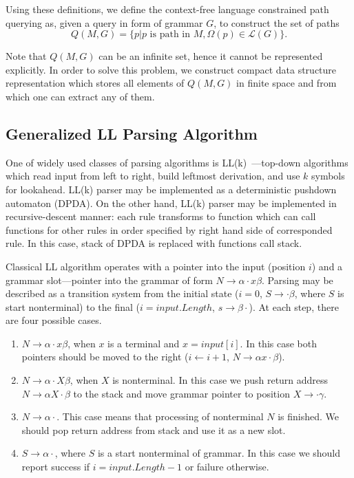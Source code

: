 Using these definitions, we define the context-free language constrained path querying as, given a query in form of grammar $G$, to construct the set of paths $$Q(M,G)=\{p|p \text{ is path in } M, \Omega(p) \in \mathcal{L}(G)\}.$$

Note that $Q(M, G)$ can be an infinite set, hence it cannot be represented explicitly. 
In order to solve this problem, we construct compact data structure representation which stores all elements of $Q(M,G)$ in finite space and from which one can extract any of them.

\subsection{Generalized LL Parsing Algorithm}\label{BasicGLL}

One of widely used classes of parsing algorithms is LL(k)~\cite{Grune}---top-down algorithms which read input from left to right, build leftmost derivation, and use $k$ symbols for lookahead.
LL(k) parser may be implemented as a deterministic pushdown automaton (DPDA).
On the other hand, LL(k) parser may be implemented in recursive-descent manner: each rule transforms to function which can call functions for other rules in order specified by right hand side of corresponded rule.
In this case, stack of DPDA is replaced with functions call stack.

Classical LL algorithm operates with a pointer into the input (position $i$) and a grammar slot---pointer into the grammar of form $N \rightarrow \alpha \cdot x \beta $.
Parsing may be described as a transition system from the initial state ($i = 0$, $S \rightarrow \cdot \beta $, where $S$ is start nonterminal) to the final ($i = input.Length$, $s \rightarrow \beta \cdot$).
At each step, there are four possible cases. 

\begin{enumerate}
\item $N \rightarrow \alpha \cdot x \beta $, when $x$ is a terminal and $x = input[i]$. In this case both pointers should be moved to the right ($i \leftarrow i + 1$, $N \rightarrow \alpha  x \cdot \beta $).
\item $N \rightarrow \alpha \cdot X \beta $, when $X$ is nonterminal. In this case we push return address $N \rightarrow \alpha X \cdot \beta $ to the stack and move grammar pointer to position $X \rightarrow \cdot \gamma$.\label{itm:2}
\item $N \rightarrow \alpha \cdot $. This case means that processing of nonterminal $N$ is finished. We should pop return address from stack and use it as a new slot.\label{itm:3}
\item $S \rightarrow \alpha \cdot $, where $S$ is a start nonterminal of grammar. In this case we should report success if $i = input.Length - 1$ or failure otherwise. 
\end{enumerate}

